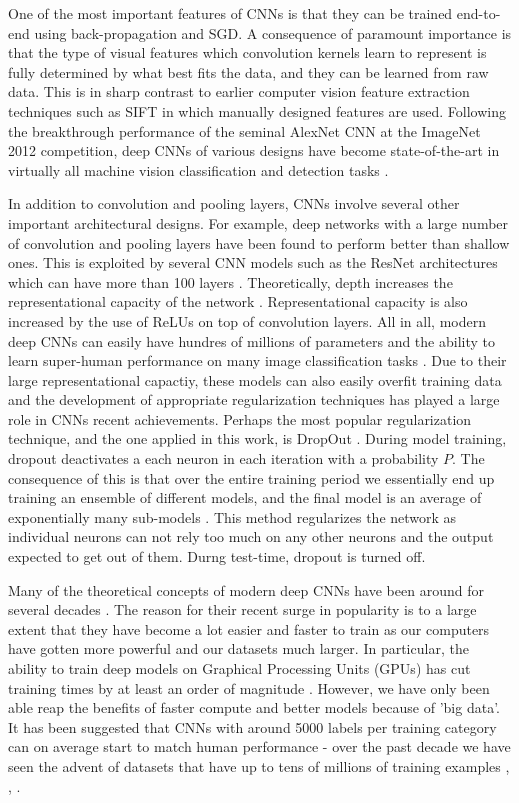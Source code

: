 \documentclass[12pt]{report}
\begin{document}
One of the most important features of CNNs is that they can be trained end-to-end using back-propagation and SGD. A consequence of paramount importance is that the type of visual features which convolution kernels learn to represent is fully determined by what best fits the data, and they can be learned from raw data. This is in sharp contrast to earlier computer vision feature extraction techniques \cite{Prince2012} such as SIFT \cite{Lowe1999} in which manually designed features are used. Following the breakthrough performance of the seminal AlexNet CNN \cite{Krizhevsky2012} at the ImageNet 2012 competition, deep CNNs of various designs have become state-of-the-art in virtually all machine vision classification and detection tasks \cite{JurgenSchmidhuber2015}.

In addition to convolution and pooling layers, CNNs involve several other important architectural designs. For example, deep networks with a large number of convolution and pooling layers have been found to perform better \cite{Srivastava2015} than shallow ones. This is exploited by several CNN models such as the ResNet architectures which can have more than 100 layers \cite{He2015}. Theoretically, depth increases the representational capacity of the network \cite{Sun2015}. Representational capacity is also increased by the use of ReLUs on top of convolution layers. All in all, modern deep CNNs can easily have hundres of millions of parameters and the ability to learn super-human performance on many image classification tasks \cite{Lecun2015}. Due to their large representational capactiy, these models can also easily overfit training data and the development of appropriate regularization techniques has played a large role in CNNs recent achievements. Perhaps the most popular regularization technique, and the one applied in this work, is DropOut \cite{Srivastava2014}. During model training, dropout deactivates a each neuron in each iteration with a probability $P$. The consequence of this is that over the entire training period we essentially end up training an ensemble of different models, and the final model is an average of exponentially many sub-models \cite{Goodfellow2016}. This method regularizes the network as individual neurons can not rely too much on any other neurons and the output expected to get out of them. Durng test-time, dropout is turned off.

Many of the theoretical concepts of modern deep CNNs have been around for several decades \cite{JurgenSchmidhuber2015}. The reason for their recent surge in popularity is to a large extent that they have become a lot easier and faster to train as our computers have gotten more powerful and our datasets much larger. In particular, the ability to train deep models on Graphical Processing Units (GPUs) has cut training times by at least an order of magnitude \cite{Lecun2015}. However, we have only been able reap the benefits of faster compute and better models because of 'big data'. It has been suggested that CNNs with around 5000 labels per training category can on average start to match human performance \cite{Goodfellow2016} - over the past decade we have seen the advent of datasets that have up to tens of millions of training examples \cite{Russakovsky2015i}, \cite{JiaDeng2009}, \cite{Netzer2011}.
\end{document}
